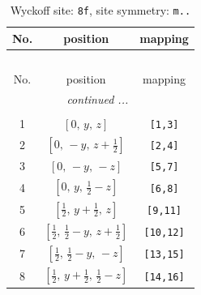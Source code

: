 \documentclass[fleqn,8pt]{jsarticle}
\begin{document}
\begin{longtable}{ccc}
\caption{Wyckoff site: {\tt 8f}, site symmetry: {\tt m..}}
 \\
 \hline \hline
No. & position & mapping \\ \hline \endfirsthead

\multicolumn{2}{l}{\tablename\ \thetable{}} \\
 \hline \hline
No. & position & mapping \\ \hline \endhead

 \hline \hline
\multicolumn{2}{r}{\footnotesize\it continued ...} \\ \endfoot

 \hline \hline
\multicolumn{2}{r}{} \\ \endlastfoot

1 & $\left[ 0,\, y,\, z \right]$ & {\tt [1,3]} \\ \hline
2 & $\left[ 0,\, - y,\, z + \frac{1}{2} \right]$ & {\tt [2,4]} \\ \hline
3 & $\left[ 0,\, - y,\, - z \right]$ & {\tt [5,7]} \\ \hline
4 & $\left[ 0,\, y,\, \frac{1}{2} - z \right]$ & {\tt [6,8]} \\ \hline
5 & $\left[ \frac{1}{2},\, y + \frac{1}{2},\, z \right]$ & {\tt [9,11]} \\ \hline
6 & $\left[ \frac{1}{2},\, \frac{1}{2} - y,\, z + \frac{1}{2} \right]$ & {\tt [10,12]} \\ \hline
7 & $\left[ \frac{1}{2},\, \frac{1}{2} - y,\, - z \right]$ & {\tt [13,15]} \\ \hline
8 & $\left[ \frac{1}{2},\, y + \frac{1}{2},\, \frac{1}{2} - z \right]$ & {\tt [14,16]} \\
\end{longtable}
\renewcommand{\arraystretch}{1.2}
\end{document}
